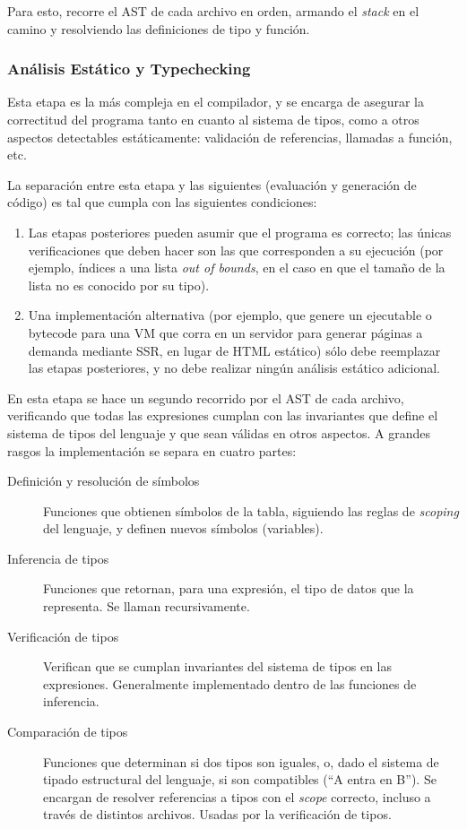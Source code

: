 Para esto, recorre el AST de cada archivo en orden, armando el \textit{stack} en el camino y resolviendo las definiciones de tipo y función.

\subsubsection{Análisis Estático y Typechecking}

Esta etapa es la más compleja en el compilador, y se encarga de asegurar la correctitud del programa tanto en cuanto al sistema de tipos, como a otros aspectos detectables estáticamente: validación de referencias, llamadas a función, etc.

La separación entre esta etapa y las siguientes (evaluación y generación de código) es tal que cumpla con las siguientes condiciones:

\begin{enumerate}
	\item Las etapas posteriores pueden asumir que el programa es correcto; las únicas verificaciones que deben hacer son las que corresponden a su ejecución (por ejemplo, índices a una lista \textit{out of bounds}, en el caso en que el tamaño de la lista no es conocido por su tipo).
	\item Una implementación alternativa (por ejemplo, que genere un ejecutable o bytecode para una VM que corra en un servidor para generar páginas a demanda mediante SSR, en lugar de HTML estático) sólo debe reemplazar las etapas posteriores, y no debe realizar ningún análisis estático adicional.
\end{enumerate}

En esta etapa se hace un segundo recorrido por el AST de cada archivo, verificando que todas las expresiones cumplan con las invariantes que define el sistema de tipos del lenguaje y que sean válidas en otros aspectos. A grandes rasgos la implementación se separa en cuatro partes:

\begin{description}
	\item[Definición y resolución de símbolos] Funciones que obtienen símbolos de la tabla, siguiendo las reglas de \textit{scoping} del lenguaje, y definen nuevos símbolos (variables).
	\item[Inferencia de tipos] Funciones que retornan, para una expresión, el tipo de datos que la representa. Se llaman recursivamente.
	\item[Verificación de tipos] Verifican que se cumplan invariantes del sistema de tipos en las expresiones. Generalmente implementado dentro de las funciones de inferencia.
	\item[Comparación de tipos] Funciones que determinan si dos tipos son iguales, o, dado el sistema de tipado estructural del lenguaje, si son compatibles (``A entra en B''). Se encargan de resolver referencias a tipos con el \textit{scope} correcto, incluso a través de distintos archivos. Usadas por la verificación de tipos.
\end{description}


